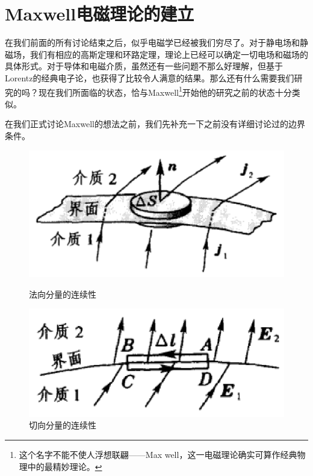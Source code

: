\documentclass[12pt,a4paper,oneside]{report}
\theoremstyle{definition}
\theoremstyle{remark}
\begin{document}
\section{Maxwell电磁理论的建立}
在我们前面的所有讨论结束之后，似乎电磁学已经被我们穷尽了。对于静电场和静磁场，我们有相应的高斯定理和环路定理，理论上已经可以确定一切电场和磁场的具体形式。对于导体和电磁介质，虽然还有一些问题不那么好理解，但基于Lorentz的经典电子论，也获得了比较令人满意的结果。那么还有什么需要我们研究的吗？现在我们所面临的状态，恰与Maxwell\footnote{这个名字不能不使人浮想联翩——Max well，这一电磁理论确实可算作经典物理中的最精妙理论。}开始他的研究之前的状态十分类似。

在我们正式讨论Maxwell的想法之前，我们先补充一下之前没有详细讨论过的边界条件。

\begin{figure}[h]
  \centering
  \begin{minipage}[t]{0.4\textwidth}
    \centering
    \includegraphics[width=\textwidth]{5-1.png}
    \caption{法向分量的连续性}
  \end{minipage}
  \hfill
  \begin{minipage}[t]{0.4\textwidth}
    \centering
    \includegraphics[width=\textwidth]{5-2.png}
    \caption{切向分量的连续性}
  \end{minipage}
\end{figure}
\end{document}
